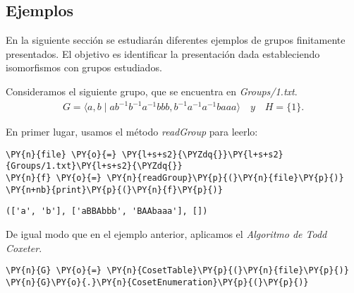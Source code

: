  
\newpage
\subsection{Ejemplos}

En la siguiente sección se estudiarán diferentes ejemplos de grupos finitamente presentados. El objetivo es identificar la presentación dada estableciendo isomorfismos con grupos estudiados.

Consideramos el siguiente grupo, que se encuentra en \textit{Groups/1.txt}.
\begin{align*} \label{1st}
    G = \langle a,b\; | \; ab^{-1}b^{-1}a^{-1}bbb, b^{-1}a^{-1}a^{-1}baaa\rangle \quad y \quad H = \{ 1\}.
\end{align*}

\begin{enumerate}
En primer lugar, usamos el método \textit{readGroup} para leerlo:


    \begin{tcolorbox}[breakable, size=fbox, boxrule=1pt, pad at break*=1mm,colback=cellbackground, colframe=cellborder]
\begin{Verbatim}[commandchars=\\\{\}]
\PY{n}{file} \PY{o}{=} \PY{l+s+s2}{\PYZdq{}}\PY{l+s+s2}{Groups/1.txt}\PY{l+s+s2}{\PYZdq{}}
\PY{n}{f} \PY{o}{=} \PY{n}{readGroup}\PY{p}{(}\PY{n}{file}\PY{p}{)}
\PY{n+nb}{print}\PY{p}{(}\PY{n}{f}\PY{p}{)}
\end{Verbatim}
\end{tcolorbox}

    \begin{Verbatim}[commandchars=\\\{\}]
(['a', 'b'], ['aBBAbbb', 'BAAbaaa'], [])
    \end{Verbatim}

De igual modo que en el ejemplo anterior, aplicamos el \textit{Algoritmo de Todd Coxeter}. 

\begin{tcolorbox}[breakable, size=fbox, boxrule=1pt, pad at break*=1mm,colback=cellbackground, colframe=cellborder]
\begin{Verbatim}[commandchars=\\\{\}]
\PY{n}{G} \PY{o}{=} \PY{n}{CosetTable}\PY{p}{(}\PY{n}{file}\PY{p}{)}
\PY{n}{G}\PY{o}{.}\PY{n}{CosetEnumeration}\PY{p}{(}\PY{p}{)}
\end{Verbatim}
\end{tcolorbox}





\end{enumerate}
